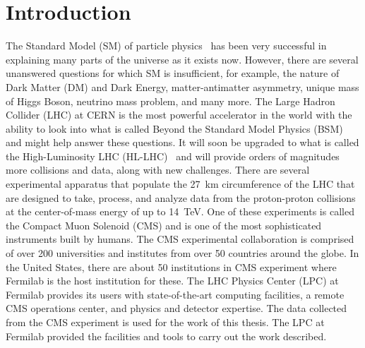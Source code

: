 \chapter{Introduction}

The Standard Model (SM) of particle physics~\cite{What_is_SM} has been very successful in explaining many parts of the universe as it exists now. However, there are several unanswered questions for which SM is insufficient, for example, the nature of Dark Matter (DM) and Dark Energy, matter-antimatter asymmetry, unique mass of Higgs Boson, neutrino mass problem, and many more. The Large Hadron Collider (LHC) \cite{What_is_LHC} at CERN\cite{What_is_CERN} is the most powerful accelerator in the world with the ability to look into what is called Beyond the Standard Model Physics (BSM) and might help answer these questions. It will soon be upgraded to what is called the High-Luminosity LHC (HL-LHC)~\cite{hl-lhc} and will provide orders of magnitudes more collisions and data, along with new challenges. There are several experimental apparatus that populate the 27~\unit{km} circumference of the LHC that are designed to take, process, and analyze data from the proton-proton collisions at the center-of-mass energy of up to 14~\unit{TeV}.
One of these experiments is called the Compact Muon Solenoid (CMS) \cite{What_is_CMS,CMS_detector} and is one of the most sophisticated instruments built by humans. The CMS experimental collaboration is comprised of over 200 universities and institutes from over 50 countries around the globe. In the United States, there are about 50 institutions in CMS experiment where Fermilab is the host institution for these. The LHC Physics Center (LPC) at Fermilab provides its users with state-of-the-art computing facilities, a remote CMS operations center, and physics and detector expertise. The data collected from the CMS experiment is used for the work of this thesis. The LPC at Fermilab provided the facilities and tools to carry out the work described.

